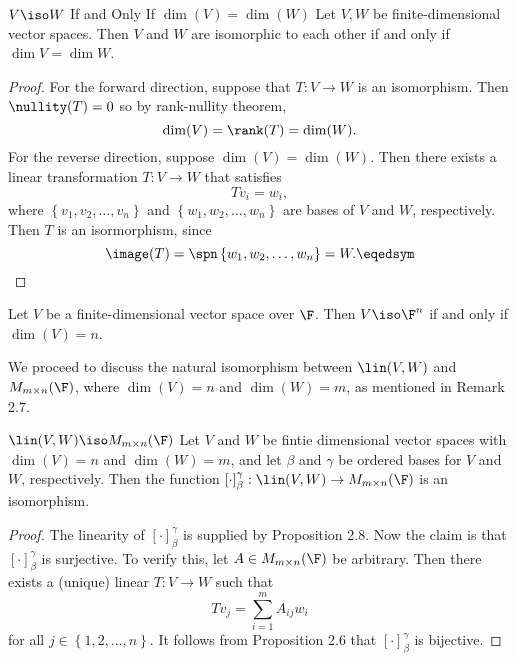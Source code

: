 \documentclass[linearalgebra]{subfiles}
\begin{document}
    \begin{prop}{$V\iso W$ If and Only If $\dim(V)=\dim(W)$}
        Let $V, W$ be finite-dimensional vector spaces. Then $V$ and $W$ are isomorphic to each other if and only if $\dim V = \dim W$.
    \end{prop}

    \begin{proof}
        For the forward direction, suppose that $T: V\to W$ is an isomorphism. Then $\nullity(T) = 0$ so by rank-nullity theorem,
        \begin{equation*}
            \dim(V)=\rank(T)=\dim(W).
        \end{equation*}
        For the reverse direction, suppose $\dim(V) = \dim(W)$. Then there exists a linear transformation $T: V\to W$ that satisfies
        \begin{equation*}
            Tv_i = w_i,
        \end{equation*}
        where $\left\lbrace v_1, v_2, \ldots, v_n \right\rbrace$ and $\left\lbrace w_1, w_2, \ldots, w_n \right\rbrace$ are bases of $V$ and $W$, respectively. Then $T$ is an isormorphism, since
        \begin{equation*}
            \image(T) = \spn \left\lbrace w_1, w_2, \ldots, w_n \right\rbrace = W. \eqedsym
        \end{equation*}
    \end{proof}

    \begin{cor}{}
        Let $V$ be a finite-dimensional vector space over $\F$. Then $V\iso\F^n$ if and only if $\dim(V)=n$.
    \end{cor}	

    \begin{remark}
        We proceed to discuss the natural isomorphism between $\lin(V,W)$ and $M_{m\times n}(\F)$, where $\dim(V)=n$ and $\dim(W)=m$, as mentioned in Remark 2.7.
    \end{remark}

    \begin{theorem}{$\lin(V,W)\iso M_{m\times n}(\F)$}
        Let $V$ and $W$ be fintie dimensional vector spaces with $\dim(V) = n$ and $\dim(W) = m$, and let $\beta$ and $\gamma$ be ordered bases for $V$ and $W$, respectively. Then the function $\left[ \cdot \right] ^\gamma_\beta:\lin(V,W)\to M_{m\times n}(\F)$ is an isomorphism.
    \end{theorem}

    \begin{proof}
        The linearity of $\left[ \cdot \right] ^\gamma_\beta$ is supplied by Proposition 2.8. Now the claim is that $\left[ \cdot \right] ^\gamma_\beta$ is surjective. To verify this, let $A\in M_{m\times n}(\F)$ be arbitrary. Then there exists a (unique) linear $T:V\to W$ such that
        \begin{equation*}
            Tv_j = \sum^{m}_{i=1} A_{ij}w_i
        \end{equation*}
        for all $j\in\left\lbrace 1,2,\ldots,n \right\rbrace$. It follows from Proposition 2.6 that $\left[ \cdot \right] ^\gamma_\beta$ is bijective.
    \end{proof}
\end{document}
